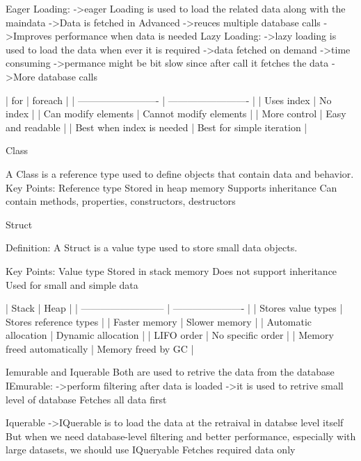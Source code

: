Eager Loading:
                ->eager Loading is used to load the related data along with the maindata
                ->Data is fetched in Advanced
                ->reuces multiple database calls
                ->Improves performance when data is needed
Lazy Loading:
                ->lazy loading is used to load the data when ever it is required
                ->data fetched on demand 
                ->time consuming
                ->permance might be bit slow since after call it fetches the data
                ->More database calls


| for                       | foreach                   |
| ------------------------- | ------------------------- |
| Uses index                | No index                  |
| Can modify elements       | Cannot modify elements    |
| More control              | Easy and readable         |
| Best when index is needed | Best for simple iteration |


Class

                A Class is a reference type used to define objects that contain data and behavior.
                Key Points:
                Reference type
                Stored in heap memory
                Supports inheritance
                Can contain methods, properties, constructors, destructors

Struct

Definition:
A Struct is a value type used to store small data objects.

                Key Points:
                Value type
                Stored in stack memory
                Does not support inheritance
                Used for small and simple data

| Stack                      | Heap                   |
| -------------------------- | ---------------------- |
| Stores value types         | Stores reference types |
| Faster memory              | Slower memory          |
| Automatic allocation       | Dynamic allocation     |
| LIFO order                 | No specific order      |
| Memory freed automatically | Memory freed by GC     |

Iemurable and Iquerable
                Both are used to retrive the data from the database
IEmurable:
        ->perform filtering after data is loaded
        ->it is used to retrive small level of database
        Fetches all data first

Iquerable 
        ->IQuerable is to load the data at the retraival in databse level itself
        But when we need database-level filtering and better performance, especially with large datasets, we should use IQueryable
        Fetches required data only

